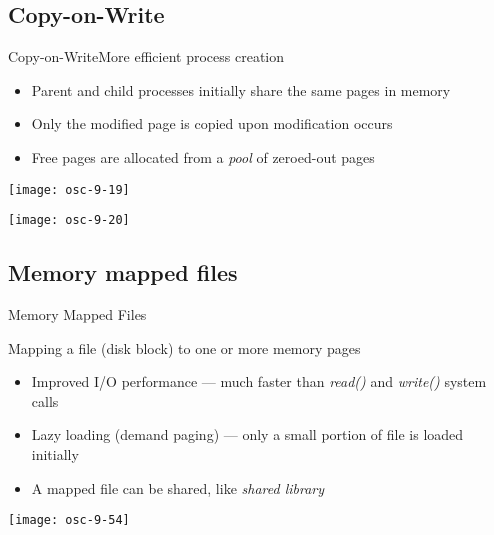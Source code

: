 \subsection{Copy-on-Write}

\begin{frame}{Copy-on-Write}{More efficient process creation}
  \begin{varwidth}{.49\textwidth}
    \begin{itemize}
    \item Parent and child processes initially share the same pages in memory
    \item Only the modified page is copied upon modification occurs
    \item Free pages are allocated from a \emph{pool} of zeroed-out pages
    \end{itemize}
  \end{varwidth}\hfill
  \begin{varwidth}{.49\textwidth}
    \begin{center}
      \texttt{[image: osc-9-19]}
    \end{center}
    \begin{center}
      \texttt{[image: osc-9-20]}
    \end{center}
  \end{varwidth}
\end{frame}

\subsection{Memory mapped files}

\begin{frame}{Memory Mapped Files}
  \begin{center}
    Mapping a file (disk block) to one or more memory pages
  \end{center}
  \begin{minipage}{.49\textwidth}
    \begin{itemize}
    \item \alert{Improved I/O performance} --- much faster than \emph{read()}
      and \emph{write()} system calls
    \item \alert{Lazy loading (demand paging)} --- only a small portion of file
      is loaded initially
    \item A mapped file can be shared, like \emph{shared library}
    \end{itemize}
  \end{minipage}\quad
  \begin{minipage}{.45\textwidth}
    \texttt{[image: osc-9-54]}
  \end{minipage}
\end{frame}

